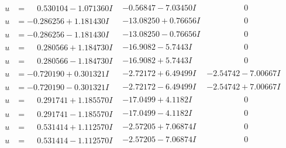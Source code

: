 \documentclass[1p]{elsarticle_modified}
\theoremstyle{definition}
\begin{document}
$$\begin{array}{c|c|c}
\begin{aligned}
u &= \phantom{-}0.530104 - 1.071360 I\end{aligned}
 & -0.56847 - 7.03450 I & \phantom{-0.000000 } 0 \\ \hline\begin{aligned}
u &= -0.286256 + 1.181430 I\end{aligned}
 & -13.08250 + 0.76656 I & \phantom{-0.000000 } 0 \\ \hline\begin{aligned}
u &= -0.286256 - 1.181430 I\end{aligned}
 & -13.08250 - 0.76656 I & \phantom{-0.000000 } 0 \\ \hline\begin{aligned}
u &= \phantom{-}0.280566 + 1.184730 I\end{aligned}
 & -16.9082 - 5.7443 I & \phantom{-0.000000 } 0 \\ \hline\begin{aligned}
u &= \phantom{-}0.280566 - 1.184730 I\end{aligned}
 & -16.9082 + 5.7443 I & \phantom{-0.000000 } 0 \\ \hline\begin{aligned}
u &= -0.720190 + 0.301321 I\end{aligned}
 & -2.72172 + 6.49499 I & -2.54742 - 7.00667 I \\ \hline\begin{aligned}
u &= -0.720190 - 0.301321 I\end{aligned}
 & -2.72172 - 6.49499 I & -2.54742 + 7.00667 I \\ \hline\begin{aligned}
u &= \phantom{-}0.291741 + 1.185570 I\end{aligned}
 & -17.0499 + 4.1182 I & \phantom{-0.000000 } 0 \\ \hline\begin{aligned}
u &= \phantom{-}0.291741 - 1.185570 I\end{aligned}
 & -17.0499 - 4.1182 I & \phantom{-0.000000 } 0 \\ \hline\begin{aligned}
u &= \phantom{-}0.531414 + 1.112570 I\end{aligned}
 & -2.57205 + 7.06874 I & \phantom{-0.000000 } 0 \\ \hline\begin{aligned}
u &= \phantom{-}0.531414 - 1.112570 I\end{aligned}
 & -2.57205 - 7.06874 I & \phantom{-0.000000 } 0 \\ \hline\begin{aligned}

\end{aligned}
\end{array}$$
\end{document}
